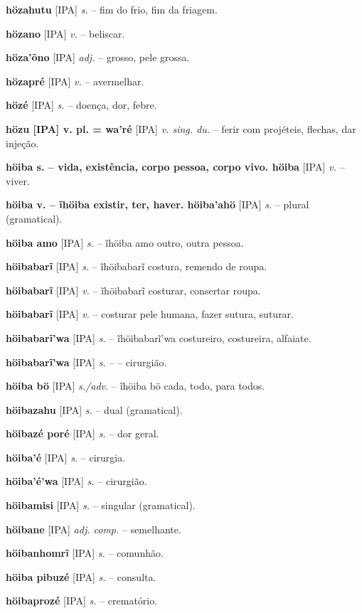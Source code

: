 \textbf{hözahutu} [IPA] \textit{s.} -- fim do frio, fim da friagem.

\textbf{hözano} [IPA] \textit{v.} -- beliscar.

\textbf{höza'õno} [IPA] \textit{adj.} -- grosso, pele grossa.

\textbf{hözapré} [IPA] \textit{v.} -- avermelhar.

\textbf{hözé} [IPA] \textit{s.} -- doença, dor, febre.

\textbf{hözu [IPA] v. pl. = wa'ré} [IPA] \textit{v. sing. du.} -- ferir com projéteis, flechas, dar injeção.

\textbf{höiba s. -- vida, existência, corpo pessoa, corpo vivo. höiba} [IPA] \textit{v.} -- viver.

\textbf{höiba v. -- ĩhöiba existir, ter, haver. höiba'ahö} [IPA] \textit{s.} -- plural (gramatical).

\textbf{höiba amo} [IPA] \textit{s.} -- ĩhöiba amo outro, outra pessoa.

\textbf{höibabarĩ} [IPA] \textit{s.} -- ĩhöibabarĩ costura, remendo de roupa.

\textbf{höibabarĩ} [IPA] \textit{v.} -- ĩhöibabarĩ costurar, consertar roupa.

\textbf{höibabarĩ} [IPA] \textit{v.} -- costurar pele humana, fazer sutura, suturar.

\textbf{höibabarĩ'wa} [IPA] \textit{s.} -- ĩhöibabarĩ'wa costureiro, costureira, alfaiate.

\textbf{höibabarĩ'wa} [IPA] \textit{s.} -- -- cirurgião.

\textbf{höiba bö} [IPA] \textit{s./adv.} -- ĩhöiba bö cada, todo, para todos.

\textbf{höibazahu} [IPA] \textit{s.} -- dual (gramatical).

\textbf{höibazé poré} [IPA] \textit{s.} -- dor geral.

\textbf{höiba'é} [IPA] \textit{s.} -- cirurgia.

\textbf{höiba'é'wa} [IPA] \textit{s.} -- cirurgião.

\textbf{höibamisi} [IPA] \textit{s.} -- singular (gramatical).

\textbf{höibane} [IPA] \textit{adj. comp.} -- semelhante.

\textbf{höibanhomrĩ} [IPA] \textit{s.} -- comunhão.

\textbf{höiba pibuzé} [IPA] \textit{s.} -- consulta.

\textbf{höibaprozé} [IPA] \textit{s.} -- crematório.

